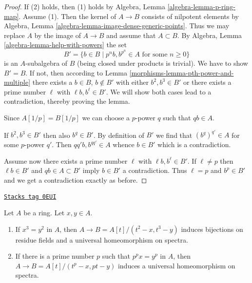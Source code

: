 \begin{proof}

If (2) holds, then (1) holds by Algebra, Lemma \ref{algebra-lemma-p-ring-map}.
Assume (1). Then the kernel of $A \to B$ consists of nilpotent
elements by Algebra, Lemma \ref{algebra-lemma-image-dense-generic-points}.
Thus we may replace $A$ by the image of $A \to B$ and assume that
$A \subset B$. By Algebra, Lemma \ref{algebra-lemma-help-with-powers}
the set
$$
B' = \{b \in B \mid p^nb, b^{p^n} \in A\text{ for some }n \geq 0\}
$$
is an $A$-subalgebra of $B$ (being closed under products is trivial).
We have to show $B' = B$. If not, then
according to Lemma \ref{morphisms-lemma-pth-power-and-multiple}
there exists a $b \in B$, $b \not \in B'$ with either
$b^2, b^3 \in B'$ or there exists a prime number $\ell$
with $\ell b, b^\ell \in B'$.
We will show both cases lead to a contradiction, thereby proving the lemma.

\medskip\noindent
Since $A[1/p] = B[1/p]$ we can choose a $p$-power $q$ such that $qb \in A$.

\medskip\noindent
If $b^2, b^3 \in B'$ then also $b^q \in B'$. By definition of $B'$
we find that $(b^q)^{q'} \in A$ for some $p$-power $q'$.
Then $qq'b, b^{qq'} \in A$ whence $b \in B'$ which is a contradiction.

\medskip\noindent
Assume now there exists a prime number $\ell$ with $\ell b, b^\ell \in B'$.
If $\ell \not = p$ then $\ell b \in B'$ and $qb \in A \subset B'$ imply
$b \in B'$ a contradiction. Thus $\ell = p$ and $b^p \in B'$
and we get a contradiction exactly as before.
\end{proof}

\begin{lemma}
\label{morphisms-lemma-make-universal-homeo}
\href{https://stacks.math.columbia.edu/tag/0EUI}{\texttt{Stacks tag 0EUI}}

Let $A$ be a ring. Let $x, y \in A$.
\begin{enumerate}
\item If $x^3 = y^2$ in $A$, then $A \to B = A[t]/(t^2 - x, t^3 - y)$
induces bijections on residue fields and a
universal homeomorphism on spectra.
\item If there is a prime number $p$ such that $p^px = y^p$ in $A$, then
$A \to B = A[t]/(t^p - x, pt - y)$ induces a universal
homeomorphism on spectra.
\end{enumerate}
\end{lemma}

